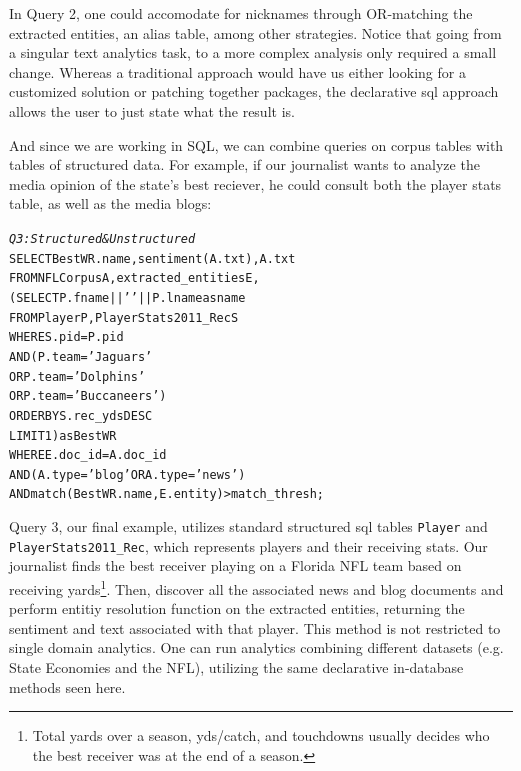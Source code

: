 In Query 2, one could accomodate for nicknames through OR-matching
the extracted entities, an alias table, among other strategies. Notice
that going from a singular text analytics task, to a more 
complex analysis only required a small change. Whereas a traditional
approach would have us either looking for a customized solution or patching
together packages, the declarative sql approach allows the user to just 
state what the result is.

And since we are working in SQL, we can combine queries on corpus 
tables with tables of structured data. For example, if our journalist
wants to analyze the media opinion of the state's best reciever,
he could consult both the player stats table, as well as the media blogs:

\begin{small}
\begin{alltt}
\textit{Q3: Structured & Unstructured}
SELECT BestWR.name, sentiment(A.txt), A.txt
FROM NFLCorpus A, extracted_entities E,
         (SELECT P.fname || ' ' || P.lname as name
          FROM Player P, PlayerStats2011_Rec S
          WHERE S.pid = P.pid
            AND (   P.team = 'Jaguars' 
                 OR P.team = 'Dolphins' 
                 OR P.team = 'Buccaneers')
          ORDER BY S.rec_yds DESC
          LIMIT 1) as BestWR
WHERE E.doc_id = A.doc_id 
  AND (A.type = 'blog' OR A.type = 'news')
  AND match(BestWR.name, E.entity) > match\_thresh;
\end{alltt}
\end{small}

Query 3, our final example, utilizes standard structured sql tables {\tt Player}
and {\tt PlayerStats2011\_Rec}, which represents players and their receiving
stats. Our journalist finds the best receiver playing on a Florida NFL team
based on receiving yards\footnote{Total yards over a season, yds/catch, and
touchdowns usually decides who the best receiver was at the end of a season.}.
Then, discover all the associated news and blog documents and perform entitiy
resolution function on the extracted entities, returning the sentiment and text
associated with that player. This method is not restricted to single domain
analytics. One can run analytics combining different datasets (e.g. State
Economies and the NFL), utilizing the same declarative in-database methods seen
here.

